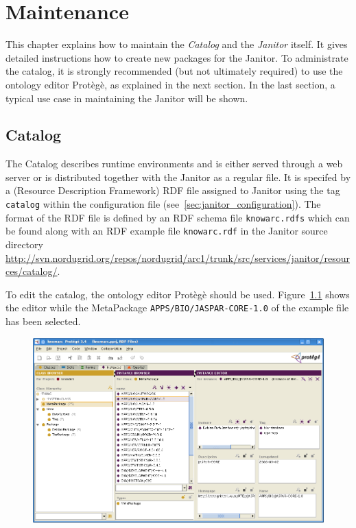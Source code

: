 \chapter{Maintenance}

This chapter explains how to maintain the {\em Catalog} and the {\em Janitor} itself. 
It gives detailed instructions how to create new packages for the Janitor.
To administrate the catalog, it is strongly recommended (but not
ultimately required) to use the ontology editor Prot\`eg\`e, as explained
in the next section.
In the last section, a typical use case in maintaining the Janitor will be shown.


\section{Catalog}\label{sec:catalog}

The Catalog describes runtime environments and is either served
through a web server or is distributed together with the Janitor as a
regular file.  It is specifed by a (Resource Description Framework)
RDF file assigned to Janitor using the tag \texttt{catalog} within
the configuration file (see~\ref{sec:janitor_configuration}).
The format of the RDF file is defined by an RDF schema file
\texttt{knowarc.rdfs} which can be found along with an RDF
example file \texttt{knowarc.rdf} in the Janitor source directory
\href{http://svn.nordugrid.org/repos/nordugrid/arc1/trunk/src/services/janitor/resources/catalog/}
{http://svn.nordugrid.org/repos/nordugrid/arc1/trunk/src/services/janitor/resources/catalog/}.

To edit the catalog, the ontology editor Prot\`eg\`e should be
used. Figure~\ref{fig:protege_example} shows the editor while the
MetaPackage \texttt{APPS/BIO/JASPAR-CORE-1.0} of the example file has
been selected.

\begin{figure}
  \begin{center}
    \includegraphics[width=\textwidth]{images/protege_JASPAR.png}
    \label{fig:protege_example}
  \end{center}
\end{figure}

